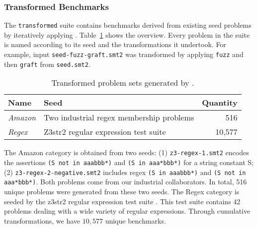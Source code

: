 \subsubsection{Transformed Benchmarks}

The \texttt{transformed}
suite contains benchmarks derived from existing seed problems by
iteratively applying \transformer{}. Table~\ref{tbl:transformed} shows
the overview. Every problem in the suite is named according to its
seed and the transformations it undertook. For example, input
\texttt{seed-fuzz-graft.smt2} was transformed by applying
\texttt{fuzz} and then \texttt{graft} from \texttt{seed.smt2}.
\begin{table}[t]
    \centering
    \caption{Transformed problem sets generated by \transformer{}.}
    \label{tbl:transformed}
    \begin{tabular}{|l|l|r|}
        \hline
        \textbf{Name}   & \textbf{Seed}                            & \textbf{Quantity} \\ \hline
        \textit{Amazon} & Two industrial regex membership problems & 516\\ \hline
        \textit{Regex}  & Z3str2 regular expression test suite     & 10,577\\ \hline
    \end{tabular}
\end{table}

The Amazon category is obtained from two seeds: (1)
\texttt{z3-regex-1.smt2} encodes the assertions \texttt{(S not in
  aaabbb*)} and \texttt{(S in aaa*bbb*)} for a string constant S; (2)
\texttt{z3-regex-2-negative.smt2} includes regex \texttt{(S in
  aaabbb*)} and \texttt{(S not in aaa*bbb*)}.  Both problems come from
our industrial collaborators. In total, 516 unique problems were
generated from these two seeds. The Regex category is seeded by the
z3str2 regular expression test suite \cite{z3str2-tests}.  This test
suite contains 42 problems dealing with a wide variety of regular
expressions.  Through cumulative transformations, we have $10,577$
unique benchmarks.
